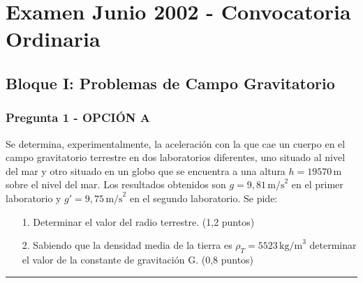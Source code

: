 \chapter{Examen Junio 2002 - Convocatoria Ordinaria}
\label{chap:2002_jun_ord}

\section{Bloque I: Problemas de Campo Gravitatorio}
\label{sec:grav_2002_jun_ord}

\subsection{Pregunta 1 - OPCIÓN A}
\label{subsec:1A_2002_jun_ord}

\begin{cajaenunciado}
Se determina, experimentalmente, la aceleración con la que cae un cuerpo en el campo gravitatorio terrestre en dos laboratorios diferentes, uno situado al nivel del mar y otro situado en un globo que se encuentra a una altura $h = 19570\,\text{m}$ sobre el nivel del mar. Los resultados obtenidos son $g=9,81\,\text{m/s}^2$ en el primer laboratorio y $g'=9,75\,\text{m/s}^2$ en el segundo laboratorio. Se pide:
\begin{enumerate}
    \item[1.] Determinar el valor del radio terrestre. (1,2 puntos)
    \item[2.] Sabiendo que la densidad media de la tierra es $\rho_T=5523\,\text{kg/m}^3$ determinar el valor de la constante de gravitación G. (0,8 puntos)
\end{enumerate}
\end{cajaenunciado}
\hrule

